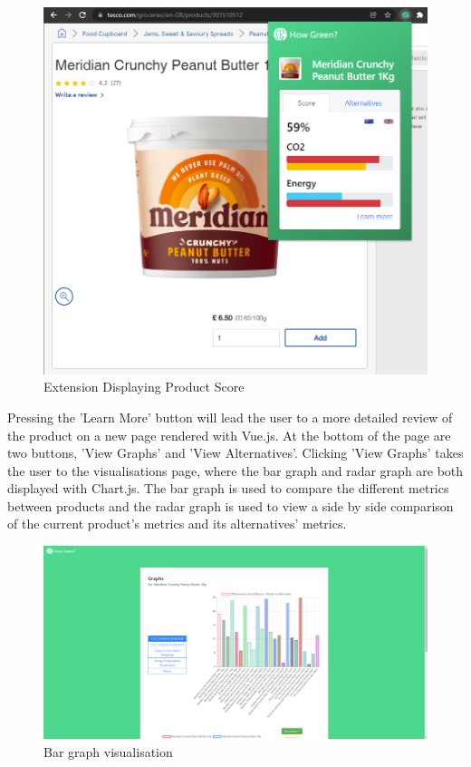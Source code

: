 \documentclass[a4,10pt,twocolumn]{article}
\begin{document}
\begin{figure}[h]
    \centering
    \includegraphics[width=0.9\columnwidth]{assets/final/product_page_with_score.png}
    \caption{Extension Displaying Product Score}
\end{figure}

Pressing the 'Learn More' button will lead the user to a more detailed review of the product on a new page rendered with Vue.js. At the bottom of the page are two buttons, 'View Graphs' and 'View Alternatives'. Clicking 'View Graphs' takes the user to the visualisations page, where the bar graph and radar graph are both displayed with Chart.js. The bar graph is used to compare the different metrics between products and the radar graph is used to view a side by side comparison of the current product's metrics and its alternatives' metrics.

\begin{figure}[h]
    \centering
    \includegraphics[width=0.9\columnwidth]{assets/final/visualisations_1.png}
    \caption{Bar graph visualisation}
\end{figure}
\end{document}
